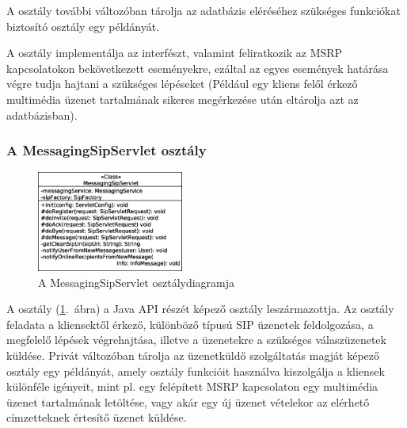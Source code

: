 A  osztály további változóban tárolja az adatbázis eléréséhez szükséges funkciókat biztosító  osztály egy példányát. 

A  osztály implementálja az  interfészt, valamint feliratkozik az MSRP kapcsolatokon bekövetkezett eseményekre, ezáltal az egyes események határása végre tudja hajtani a szükséges lépéseket (Például egy kliens felől érkező multimédia üzenet tartalmának sikeres megérkezése után eltárolja azt az adatbázisban).

\newpage

\subsubsection*{A MessagingSipServlet osztály}
\label{sec:server_messagingsipservlet}

\begin{figure}
  \vspace{-15pt}
  \begin{center}
    \includegraphics[width=0.43\textwidth]{img/class_diagrams/server/eps/MessagingSipServlet.eps}
  \end{center}
  \vspace{-15pt}
  \captionsetup{font=scriptsize}
  \caption{A MessagingSipServlet osztálydiagramja}
   \label{fig:class_server_messagingsipservlet}
  \vspace{-10pt}
\end{figure}

A  osztály (\ref{fig:class_server_messagingsipservlet}.~ábra) a Java API részét képező  osztály leszármazottja. Az osztály feladata a kliensektől érkező, különböző típusú SIP üzenetek feldolgozása, a megfelelő lépések végrehajtása, illetve a üzenetekre a szükséges válaszüzenetek küldése. Privát változóban tárolja az üzenetküldő szolgáltatás magját képező  osztály egy példányát, amely osztály funkcióit használva kiszolgálja a kliensek különféle igényeit, mint pl. egy felépített MSRP kapcsolaton egy multimédia üzenet tartalmának letöltése, vagy akár egy új üzenet vételekor az elérhető címzetteknek értesítő üzenet küldése.

